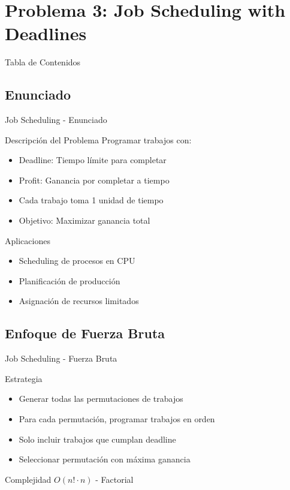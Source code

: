 \documentclass[aspectratio=169]{beamer}
\begin{document}
\section{Problema 3: Job Scheduling with Deadlines}

\begin{frame}{Tabla de Contenidos}
\end{frame}

\subsection{Enunciado}
\begin{frame}{Job Scheduling - Enunciado}
\begin{block}{Descripción del Problema}
Programar trabajos con:
\begin{itemize}
\item Deadline: Tiempo límite para completar
\item Profit: Ganancia por completar a tiempo
\item Cada trabajo toma 1 unidad de tiempo
\item Objetivo: Maximizar ganancia total
\end{itemize}
\end{block}

\begin{exampleblock}{Aplicaciones}
\begin{itemize}
\item Scheduling de procesos en CPU
\item Planificación de producción
\item Asignación de recursos limitados
\end{itemize}
\end{exampleblock}
\end{frame}

\subsection{Enfoque de Fuerza Bruta}
\begin{frame}{Job Scheduling - Fuerza Bruta}
\begin{block}{Estrategia}
\begin{itemize}
\item Generar todas las permutaciones de trabajos
\item Para cada permutación, programar trabajos en orden
\item Solo incluir trabajos que cumplan deadline
\item Seleccionar permutación con máxima ganancia
\end{itemize}
\end{block}

\begin{alertblock}{Complejidad}
$O(n! \cdot n)$ - Factorial
\end{alertblock}
\end{frame}
\end{document}
